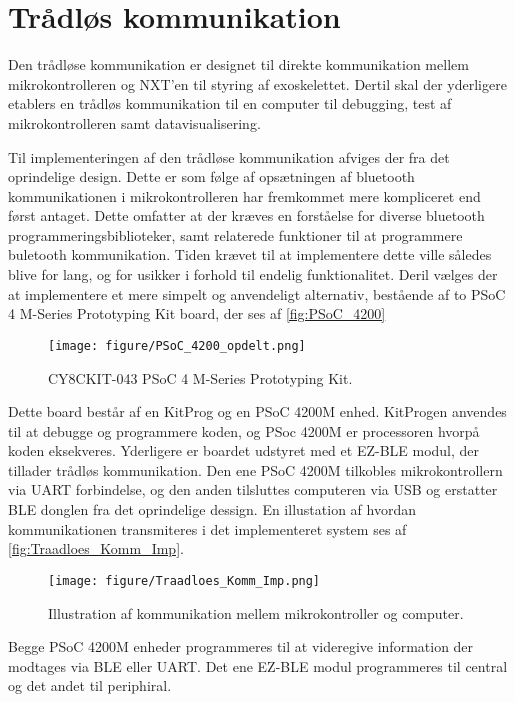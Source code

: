 \section{Trådløs kommunikation}
Den trådløse kommunikation er designet til direkte kommunikation mellem mikrokontrolleren og NXT'en til styring af exoskelettet. Dertil skal der yderligere etablers en trådløs kommunikation til en computer til debugging, test af mikrokontrolleren samt datavisualisering.   

\noindent
Til implementeringen af den trådløse kommunikation afviges der fra det oprindelige design. Dette er som følge af opsætningen af bluetooth kommunikationen i mikrokontrolleren har fremkommet mere kompliceret end først antaget. Dette omfatter at der kræves en forståelse for diverse bluetooth programmeringsbiblioteker, samt relaterede funktioner til at programmere buletooth kommunikation. Tiden krævet til at implementere dette ville således blive for lang, og for usikker i forhold til endelig funktionalitet. Deril vælges der at implementere et mere simpelt og anvendeligt alternativ, bestående af to PSoC 4 M-Series Prototyping Kit board, der ses af \autoref{fig:PSoC_4200}

\begin{figure}[H]
	\centering
	\texttt{[image: figure/PSoC\_4200\_opdelt.png]}
	\caption{CY8CKIT-043 PSoC 4 M-Series Prototyping Kit\citep{cypress42015}.}
	\label{fig:PSoC_4200}
\end{figure}

Dette board består af en KitProg og en PSoC 4200M enhed. KitProgen anvendes til at debugge og programmere koden, og PSoc 4200M er processoren hvorpå koden eksekveres. Yderligere er boardet udstyret med et EZ-BLE modul, der tillader trådløs kommunikation. 
Den ene PSoC 4200M tilkobles mikrokontrollern via UART forbindelse, og den anden tilsluttes computeren via USB og erstatter BLE donglen fra det oprindelige dessign. En illustation af hvordan kommunikationen transmiteres i det implementeret system ses af \autoref{fig:Traadloes_Komm_Imp}.

\begin{figure}[H]
	\centering
	\texttt{[image: figure/Traadloes\_Komm\_Imp.png]}
	\caption{Illustration af kommunikation mellem mikrokontroller og computer.} 
	\label{fig:Traadloes_Komm_Imp}
\end{figure}

Begge PSoC 4200M enheder programmeres til at videregive information der modtages via BLE eller UART. Det ene EZ-BLE modul programmeres til central og det andet til periphiral.    
